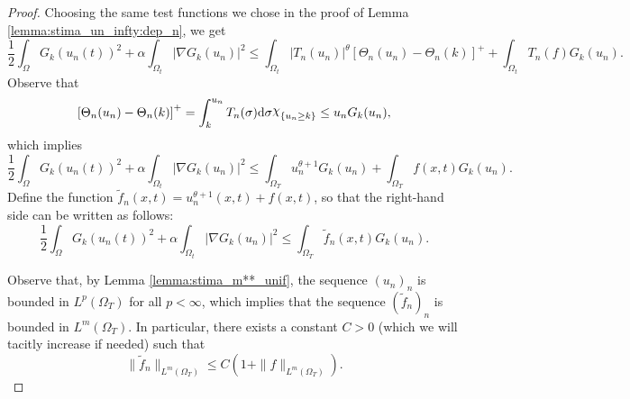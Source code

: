 \documentclass{amsart}
\numberwithin{equation}{section}
\def\elleomT#1{L^{#1}(\Omega_T)}
\def\io{\int_\Omega}
\def\iot{\int_{\Omega_t}}
\def\ioT{\int_{\Omega_T}}
\def\norma#1#2{ \|#1 \|_{#2}}
\newcommand{\abs}[1]{\left|#1\right|}
\DeclareRobustCommand{\rchi}{{\mathpalette\irchi\relax}}
\newcommand{\irchi}[2]{\raisebox{\depth}{$#1\chi$}} %
\begin{document}
\begin{proof}
   Choosing the same test functions we chose in the proof of Lemma \ref{lemma:stima_un_infty:dep_n}, we get
    $$
    \frac12 \io G_k(u_n(t))^2+\alpha\iot\abs{\nabla G_k(u_n)}^2
    \leq 
    \iot \abs{T_n(u_n)}^\theta\left[\Theta_n(u_n)-\Theta_n(k)\right]^++\iot T_n(f) G_k(u_n).
    $$
    Observe that
    \begin{equation}
        \left[\Theta_n(u_n)-\Theta_n(k)\right]^+=\int_k^{u_n}T_n(\sigma)\mathrm{d}\sigma\rchi_{\{u_n\geq k\}}\leq u_n G_k(u_n),
    \end{equation}
    which implies
    $$
    \frac12 \io G_k(u_n(t))^2+\alpha\iot\abs{\nabla G_k(u_n)}^2
    \leq 
    \ioT u_n^{\theta+1}G_k(u_n)+\ioT f(x,t) G_k(u_n).
    $$
    Define the function $\tilde f_n(x,t)=u_n^{\theta+1}(x,t)+f(x,t)$, so that the right-hand side can be written as follows:
    \begin{equation}
        \frac12 \io G_k(u_n(t))^2+\alpha\iot\abs{\nabla G_k(u_n)}^2
        \leq 
        \ioT \tilde f_n(x,t) G_k(u_n).
    \end{equation}

    Observe that, by Lemma \ref{lemma:stima_m**_unif}, the sequence $(u_n)_n$ is bounded in $\elleomT p$ for all $p<\infty$, which implies that the sequence $(\tilde f_n)_n$ is bounded in $\elleomT m$. In particular, there exists a constant $C>0$ (which we will tacitly increase if needed) such that
    \begin{equation}\label{Bound_fntilde}
        \norma{\tilde f_n}{\elleomT m}\leq  C(1+ \norma{f}{\elleomT m}).
    \end{equation}


\end{proof}
\end{document}
